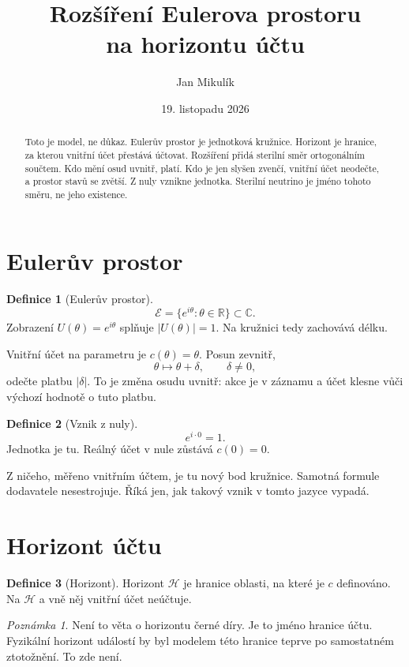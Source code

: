 \documentclass[11pt,a4paper]{article}
\title{\textbf{Rozšíření Eulerova prostoru}\\[4pt]
\large na horizontu účtu}
\author{Jan Mikulík}
\date{19. listopadu 2026}
\theoremstyle{definition}
\newtheorem{definition}{Definice}
\theoremstyle{remark}
\newtheorem{remark}{Poznámka}
\begin{document}
\maketitle

\begin{abstract}
Toto je model, ne důkaz.
Eulerův prostor je jednotková kružnice.
Horizont je hranice, za kterou vnitřní účet přestává účtovat.
Rozšíření přidá sterilní směr ortogonálním součtem.
Kdo mění osud uvnitř, platí.
Kdo je jen slyšen zvenčí, vnitřní účet neodečte, a prostor stavů se zvětší.
Z nuly vznikne jednotka.
Sterilní neutrino je jméno tohoto směru, ne jeho existence.
\end{abstract}

\section{Eulerův prostor}

\begin{definition}[Eulerův prostor]
\[
  \mathcal E=\{e^{i\theta}:\theta\in\mathbb R\}\subset\mathbb C.
\]
Zobrazení \(U(\theta)=e^{i\theta}\) splňuje \(|U(\theta)|=1\).
Na kružnici tedy zachovává délku.
\end{definition}

Vnitřní účet na parametru je \(c(\theta)=\theta\).
Posun zevnitř,
\[
  \theta\mapsto\theta+\delta,\qquad \delta\neq 0,
\]
odečte platbu \(|\delta|\).
To je změna osudu uvnitř: akce je v záznamu a účet klesne vůči výchozí hodnotě o tuto platbu.

\begin{definition}[Vznik z nuly]
\[
  e^{i\cdot 0}=1.
\]
Jednotka je tu.
Reálný účet v nule zůstává \(c(0)=0\).
\end{definition}

Z ničeho, měřeno vnitřním účtem, je tu nový bod kružnice.
Samotná formule dodavatele nesestrojuje.
Říká jen, jak takový vznik v tomto jazyce vypadá.

\section{Horizont účtu}

\begin{definition}[Horizont]
Horizont \(\mathcal H\) je hranice oblasti, na které je \(c\) definováno.
Na \(\mathcal H\) a vně něj vnitřní účet neúčtuje.
\end{definition}

\begin{remark}
Není to věta o horizontu černé díry.
Je to jméno hranice účtu.
Fyzikální horizont událostí by byl modelem této hranice teprve po samostatném ztotožnění.
To zde není.
\end{remark}
\end{document}
